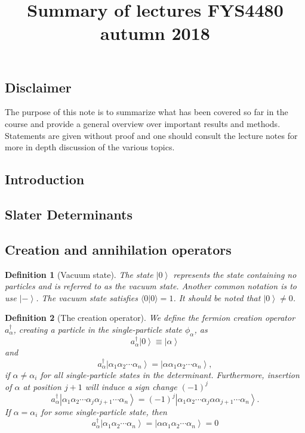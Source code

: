 \documentclass[a4paper,10pt]{report}
\title{Summary of lectures FYS4480 autumn 2018}
\newcommand{\braket}[1]{\langle#1\rangle}
\newcommand{\ket}[1]{\left| #1 \right\rangle} \newcommand{\element}[3]
\theoremstyle{definition}
\newtheorem{definition}{Definition}
\begin{document}
\maketitle

\subsection*{Disclaimer}
The purpose of this note is to summarize what has been covered so far in the course and provide a general overview over 
important results and methods. Statements are given without proof and one should consult the lecture notes for more in depth 
discussion of the various topics.

\subsection*{Introduction}

\subsection*{Slater Determinants}

\subsection*{Creation and annihilation operators}
\begin{definition}[Vacuum state]
 The state $\ket{0}$ represents the state containing no particles and is referred to as
 the vacuum state. Another common notation is to use $\ket{-}$. The vacuum state satisfies 
 $\braket{0|0} = 1$. It should be noted that $\ket{0} \neq 0$.
\end{definition}

\begin{definition}[The creation operator]
 We define the fermion creation operator $a_\alpha^\dagger$, creating a particle in the single-particle state $\phi_\alpha$, as
 \begin{equation}
  a_\alpha^\dagger \ket{0} \equiv \ket{\alpha}
 \end{equation}
 and 
 \begin{equation}
  a_\alpha^\dagger \ket{\alpha_1 \alpha_2 \cdots \alpha_n} = \ket{\alpha \alpha_1 \alpha_2 \cdots \alpha_n},
 \end{equation}
 if $\alpha \neq \alpha_i$ for all single-particle states in the determinant. 
 Furthermore, insertion of $\alpha$ at position $j+1$ will induce a sign change $(-1)^j$
 \begin{equation}
  a_\alpha^\dagger \ket{\alpha_1 \alpha_2 \cdots \alpha_j \alpha_{j+1} \cdots \alpha_n} = (-1)^j\ket{\alpha_1 \alpha_2 \cdots \alpha_j \alpha \alpha_{j+1} \cdots \alpha_n}.
 \end{equation}
 If $\alpha = \alpha_i$ for some single-particle state, then 
 \begin{equation}
  a_\alpha^\dagger \ket{\alpha_1 \alpha_2 \cdots \alpha_n} = \ket{\alpha \alpha_1 \alpha_2 \cdots \alpha_n} = 0
 \end{equation}
\end{definition}
\end{document}
